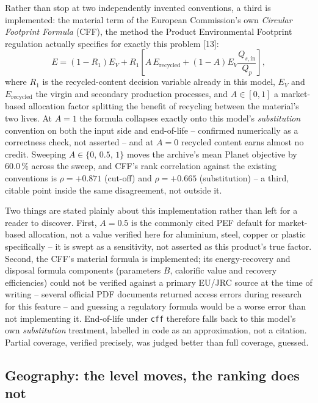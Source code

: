 \documentclass[11pt,a4paper]{article}
\begin{document}
Rather than stop at two independently invented conventions, a third is
implemented: the material term of the European Commission's own \emph{Circular
Footprint Formula} (CFF), the method the Product Environmental Footprint
regulation actually specifies for exactly this problem [13]:
\[
E = (1-R_1)E_V + R_1\left[A\,E_{\text{recycled}}
+ (1-A)E_V\frac{Q_{s,\text{in}}}{Q_p}\right],
\]
where $R_1$ is the recycled-content decision variable already in this model,
$E_V$ and $E_{\text{recycled}}$ the virgin and secondary production
processes, and $A\in[0,1]$ a market-based allocation factor splitting the
benefit of recycling between the material's two lives. At $A=1$ the formula
collapses exactly onto this model's \emph{substitution} convention on both the
input side and end-of-life -- confirmed numerically as a correctness check,
not asserted -- and at $A=0$ recycled content earns almost no credit. Sweeping
$A\in\{0,\,0.5,\,1\}$ moves the archive's mean Planet objective by
60.0\,\% across the sweep, and CFF's rank correlation against the
existing conventions is $\rho=+0.871$ (cut-off) and
$\rho=+0.665$ (substitution) -- a third, citable point inside the same
disagreement, not outside it.

Two things are stated plainly about this implementation rather than left for
a reader to discover. First, $A=0.5$ is the commonly cited PEF default for
market-based allocation, not a value verified here for aluminium, steel,
copper or plastic specifically -- it is swept as a sensitivity, not asserted
as this product's true factor. Second, the CFF's material formula is
implemented; its energy-recovery and disposal formula components (parameters
$B$, calorific value and recovery efficiencies) could not be verified against
a primary EU/JRC source at the time of writing -- several official PDF
documents returned access errors during research for this feature -- and
guessing a regulatory formula would be a worse error than not implementing
it. End-of-life under \texttt{cff} therefore falls back to this model's own
\emph{substitution} treatment, labelled in code as an approximation, not a
citation. Partial coverage, verified precisely, was judged better than full
coverage, guessed.

\subsection{Geography: the level moves, the ranking does not}
\end{document}

